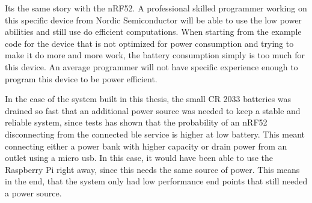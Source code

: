 Its the same story with the nRF52. A professional skilled programmer working on this specific device from Nordic Semiconductor will be able to use the low power abilities and still use do efficient computations. When starting from the example code for the device that is not optimized for power consumption and trying to make it do more and more work, the battery consumption simply is too much for this device. An average programmer will not have specific experience enough to program this device to be power efficient. 

In the case of the system built in this thesis, the small CR 2033 batteries was drained so fast that an additional power source was needed to keep a stable and reliable system, since tests has shown that the probability of an nRF52 disconnecting from the connected \gls{ble} service is higher at low battery. This meant connecting either a power bank with higher capacity or drain power from an outlet using a micro \gls{usb}. In this case, it would have been able to use the Raspberry Pi right away, since this needs the same source of power. This means in the end, that the system only had low performance end points that still needed a power source. 




